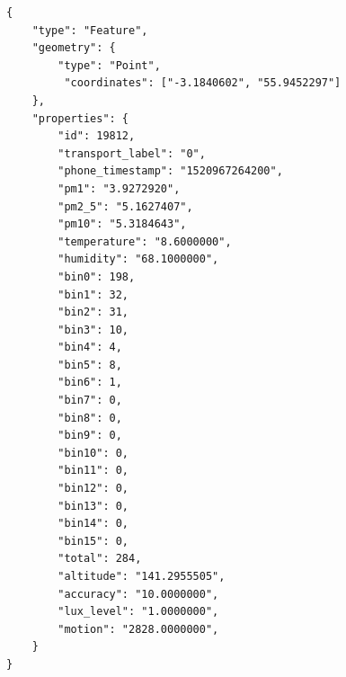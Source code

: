 \documentclass[bsc,frontabs,twoside,singlespacing, parskip,deptreport]{infthesis}     %
\begin{document}
\begin{appendices}
\begin{lstlisting}[caption={This code listing represents an example of a data input in GeoJSON format, which is sent from the back-end to the front-end of the data visualization tool after performing modes of transport classification. The "transport\_label" key represents the id corresponding to a certain mode of transport}]
{
	"type": "Feature", 
	"geometry": {
		"type": "Point",
		 "coordinates": ["-3.1840602", "55.9452297"]
	}, 
	"properties": {
		"id": 19812, 
		"transport_label": "0", 
		"phone_timestamp": "1520967264200", 
		"pm1": "3.9272920", 
		"pm2_5": "5.1627407", 
		"pm10": "5.3184643", 
		"temperature": "8.6000000", 
		"humidity": "68.1000000", 
		"bin0": 198, 
		"bin1": 32, 
		"bin2": 31, 
		"bin3": 10, 
		"bin4": 4, 
		"bin5": 8, 
		"bin6": 1, 
		"bin7": 0, 
		"bin8": 0, 
		"bin9": 0, 
		"bin10": 0, 
		"bin11": 0, 
		"bin12": 0, 
		"bin13": 0, 
		"bin14": 0, 
		"bin15": 0, 
		"total": 284, 
		"altitude": "141.2955505", 
		"accuracy": "10.0000000", 
		"lux_level": "1.0000000", 
		"motion": "2828.0000000", 
	}
}
\end{lstlisting}


\end{appendices}
\end{document}
